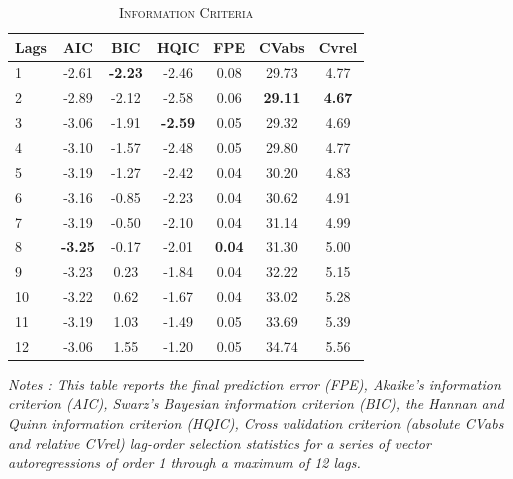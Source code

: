 \documentclass[11pt,a4paper]{article}
\begin{document}
%
\begin{table}[H] 
	\centering 
	\begin{threeparttable} 
		\caption{\textsc{Information Criteria}} \label{tab:IC} 
		\begin{tabular*}{0.55 \textwidth }{lcccccc} 
			\toprule \toprule  
			\textbf{Lags} & \textbf{AIC} & \textbf{BIC} & \textbf{HQIC} & \textbf{FPE} & \textbf{CVabs} & \textbf{Cvrel} \tabularnewline \midrule 1  &    -2.61 &    \textbf{-2.23} &    -2.46 &     0.08 &    29.73 &     4.77 \\ 
			2  &    -2.89 &    -2.12 &    -2.58 &     0.06 &    \textbf{29.11} &     \textbf{4.67} \\ 
			3  &    -3.06 &    -1.91 &    \textbf{-2.59} &     0.05 &    29.32 &     4.69 \\ 
			4  &    -3.10 &    -1.57 &    -2.48 &     0.05 &    29.80 &     4.77 \\ 
			5  &    -3.19 &    -1.27 &    -2.42 &     0.04 &    30.20 &     4.83 \\ 
			6  &    -3.16 &    -0.85 &    -2.23 &     0.04 &    30.62 &     4.91 \\ 
			7  &    -3.19 &    -0.50 &    -2.10 &     0.04 &    31.14 &     4.99 \\ 
			8  &    \textbf{-3.25} &    -0.17 &    -2.01 &     \textbf{0.04} &    31.30 &     5.00 \\ 
			9  &    -3.23 &     0.23 &    -1.84 &     0.04 &    32.22 &     5.15 \\ 
			10 &    -3.22 &     0.62 &    -1.67 &     0.04 &    33.02 &     5.28 \\ 
			11 &    -3.19 &     1.03 &    -1.49 &     0.05 &    33.69 &     5.39 \\ 
			12 &    -3.06 &     1.55 &    -1.20 &     0.05 &    34.74 &     5.56 \\ 
			\bottomrule \bottomrule 
		\end{tabular*} 
		\begin{tablenotes} 
			\small 
			\item \emph{ \footnotesize{ Notes : This table reports the final prediction error (FPE), Akaike's information criterion (AIC), Swarz's Bayesian information criterion (BIC), the Hannan and Quinn information criterion (HQIC), Cross validation criterion (absolute CVabs and relative CVrel) lag-order selection statistics for a series of vector autoregressions of order 1 through a maximum of 12 lags.  } } 
		\end{tablenotes} 
	\end{threeparttable} 
\end{table} 
\end{document}
